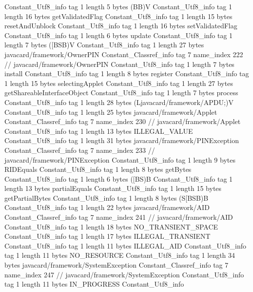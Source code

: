 {{{		}
		Constant_Utf8_info {
			tag	1
			length	5
			bytes	(BB)V
		}
		Constant_Utf8_info {
			tag	1
			length	16
			bytes	getValidatedFlag
		}
		Constant_Utf8_info {
			tag	1
			length	15
			bytes	resetAndUnblock
		}
		Constant_Utf8_info {
			tag	1
			length	16
			bytes	setValidatedFlag
		}
		Constant_Utf8_info {
			tag	1
			length	6
			bytes	update
		}
		Constant_Utf8_info {
			tag	1
			length	7
			bytes	([BSB)V
		}
		Constant_Utf8_info {
			tag	1
			length	27
			bytes	javacard/framework/OwnerPIN
		}
		Constant_Classref_info {
			tag	7
			name_index	222		// javacard/framework/OwnerPIN
		}
		Constant_Utf8_info {
			tag	1
			length	7
			bytes	install
		}
		Constant_Utf8_info {
			tag	1
			length	8
			bytes	register
		}
		Constant_Utf8_info {
			tag	1
			length	15
			bytes	selectingApplet
		}
		Constant_Utf8_info {
			tag	1
			length	27
			bytes	getShareableInterfaceObject
		}
		Constant_Utf8_info {
			tag	1
			length	7
			bytes	process
		}
		Constant_Utf8_info {
			tag	1
			length	28
			bytes	(Ljavacard/framework/APDU;)V
		}
		Constant_Utf8_info {
			tag	1
			length	25
			bytes	javacard/framework/Applet
		}
		Constant_Classref_info {
			tag	7
			name_index	230		// javacard/framework/Applet
		}
		Constant_Utf8_info {
			tag	1
			length	13
			bytes	ILLEGAL_VALUE
		}
		Constant_Utf8_info {
			tag	1
			length	31
			bytes	javacard/framework/PINException
		}
		Constant_Classref_info {
			tag	7
			name_index	233		// javacard/framework/PINException
		}
		Constant_Utf8_info {
			tag	1
			length	9
			bytes	RIDEquals
		}
		Constant_Utf8_info {
			tag	1
			length	8
			bytes	getBytes
		}
		Constant_Utf8_info {
			tag	1
			length	6
			bytes	([BS)B
		}
		Constant_Utf8_info {
			tag	1
			length	13
			bytes	partialEquals
		}
		Constant_Utf8_info {
			tag	1
			length	15
			bytes	getPartialBytes
		}
		Constant_Utf8_info {
			tag	1
			length	8
			bytes	(S[BSB)B
		}
		Constant_Utf8_info {
			tag	1
			length	22
			bytes	javacard/framework/AID
		}
		Constant_Classref_info {
			tag	7
			name_index	241		// javacard/framework/AID
		}
		Constant_Utf8_info {
			tag	1
			length	18
			bytes	NO_TRANSIENT_SPACE
		}
		Constant_Utf8_info {
			tag	1
			length	17
			bytes	ILLEGAL_TRANSIENT
		}
		Constant_Utf8_info {
			tag	1
			length	11
			bytes	ILLEGAL_AID
		}
		Constant_Utf8_info {
			tag	1
			length	11
			bytes	NO_RESOURCE
		}
		Constant_Utf8_info {
			tag	1
			length	34
			bytes	javacard/framework/SystemException
		}
		Constant_Classref_info {
			tag	7
			name_index	247		// javacard/framework/SystemException
		}
		Constant_Utf8_info {
			tag	1
			length	11
			bytes	IN_PROGRESS
		}
		Constant_Utf8_info {
}}}
